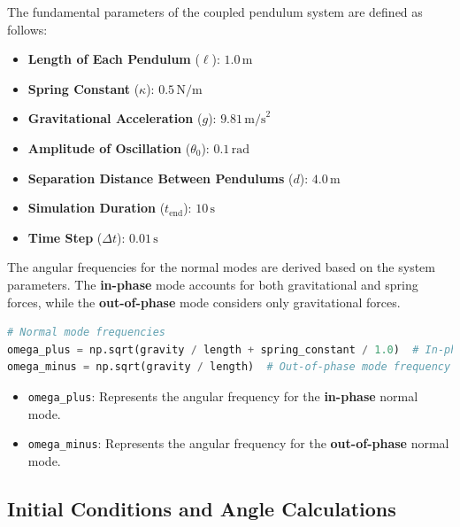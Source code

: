 \documentclass[12pt]{report} %
\begin{document}
The fundamental parameters of the coupled pendulum system are defined as follows:

\begin{itemize}
    \item \textbf{Length of Each Pendulum} (\( \ell \)): \( 1.0 \, \text{m} \)
    \item \textbf{Spring Constant} (\( \kappa \)): \( 0.5 \, \text{N/m} \)
    \item \textbf{Gravitational Acceleration} (\( g \)): \( 9.81 \, \text{m/s}^2 \)
    \item \textbf{Amplitude of Oscillation} (\( \theta_0 \)): \( 0.1 \, \text{rad} \)
    \item \textbf{Separation Distance Between Pendulums} (\( d \)): \( 4.0 \, \text{m} \)
    \item \textbf{Simulation Duration} (\( t_{\text{end}} \)): \( 10 \, \text{s} \)
    \item \textbf{Time Step} (\( \Delta t \)): \( 0.01 \, \text{s} \)
\end{itemize}

The angular frequencies for the normal modes are derived based on the system parameters. The \textbf{in-phase} mode accounts for both gravitational and spring forces, while the \textbf{out-of-phase} mode considers only gravitational forces.

\begin{lstlisting}[language=Python, caption={Calculating Normal Mode Frequencies}, label={lst:normal_mode_frequencies_task4}]
# Normal mode frequencies
omega_plus = np.sqrt(gravity / length + spring_constant / 1.0)  # In-phase mode frequency
omega_minus = np.sqrt(gravity / length)  # Out-of-phase mode frequency
\end{lstlisting}

\begin{itemize}
    \item \texttt{omega\_plus}: Represents the angular frequency for the \textbf{in-phase} normal mode.
    \item \texttt{omega\_minus}: Represents the angular frequency for the \textbf{out-of-phase} normal mode.
\end{itemize}

\subsection{Initial Conditions and Angle Calculations}
\label{subsec:part1_task4_initial_conditions}
\end{document}
